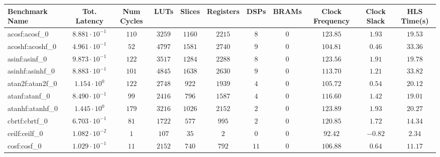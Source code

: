 \begin{tabular}{|l|c|c|c|c|c|c|c|c|c|c|}
\hline
Benchmark Name               & Tot. Latency            & Num Cycles & LUTs      & Slices    & Registers & DSPs    & BRAMs & Clock Frequency & Clock Slack & HLS Time(s) \\
\hline
acosf:acosf\_0               & $ 8.881 \cdot 10^{-1} $ & $ 110    $ & $ 3259  $ & $ 1160  $ & $ 2215  $ & $ 8   $ & $ 0 $ & $ 123.85      $ & $ 1.93    $ & $ 19.53   $ \\
acoshf:acoshf\_0             & $ 4.961 \cdot 10^{-1} $ & $ 52     $ & $ 4797  $ & $ 1581  $ & $ 2740  $ & $ 9   $ & $ 0 $ & $ 104.81      $ & $ 0.46    $ & $ 33.36   $ \\
asinf:asinf\_0               & $ 9.873 \cdot 10^{-1} $ & $ 122    $ & $ 3517  $ & $ 1284  $ & $ 2288  $ & $ 8   $ & $ 0 $ & $ 123.56      $ & $ 1.91    $ & $ 19.78   $ \\
asinhf:asinhf\_0             & $ 8.883 \cdot 10^{-1} $ & $ 101    $ & $ 4845  $ & $ 1638  $ & $ 2630  $ & $ 9   $ & $ 0 $ & $ 113.70      $ & $ 1.21    $ & $ 33.82   $ \\
atan2f:atan2f\_0             & $ 1.154 \cdot 10^{0}  $ & $ 122    $ & $ 2748  $ & $ 922   $ & $ 1939  $ & $ 4   $ & $ 0 $ & $ 105.72      $ & $ 0.54    $ & $ 20.12   $ \\
atanf:atanf\_0               & $ 8.490 \cdot 10^{-1} $ & $ 99     $ & $ 2416  $ & $ 796   $ & $ 1587  $ & $ 4   $ & $ 0 $ & $ 116.60      $ & $ 1.42    $ & $ 19.01   $ \\
atanhf:atanhf\_0             & $ 1.445 \cdot 10^{0}  $ & $ 179    $ & $ 3216  $ & $ 1026  $ & $ 2152  $ & $ 2   $ & $ 0 $ & $ 123.89      $ & $ 1.93    $ & $ 20.27   $ \\
cbrtf:cbrtf\_0               & $ 6.703 \cdot 10^{-1} $ & $ 81     $ & $ 1722  $ & $ 577   $ & $ 995   $ & $ 2   $ & $ 0 $ & $ 120.85      $ & $ 1.72    $ & $ 14.34   $ \\
ceilf:ceilf\_0               & $ 1.082 \cdot 10^{-2} $ & $ 1      $ & $ 107   $ & $ 35    $ & $ 2     $ & $ 0   $ & $ 0 $ & $ 92.42       $ & $ -0.82   $ & $ 2.34    $ \\
cosf:cosf\_0                 & $ 1.029 \cdot 10^{-1} $ & $ 11     $ & $ 2152  $ & $ 740   $ & $ 792   $ & $ 11  $ & $ 0 $ & $ 106.88      $ & $ 0.64    $ & $ 11.17   $ \\

\end{tabular}
